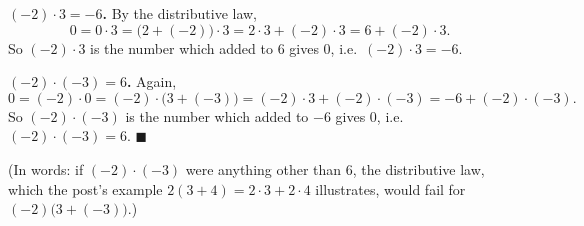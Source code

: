 \textbf{$(-2)\cdot3=-6$.} By the distributive law,
\[
0=0\cdot3=\bigl(2+(-2)\bigr)\cdot3=2\cdot3+(-2)\cdot3=6+(-2)\cdot3 .
\]
So $(-2)\cdot3$ is the number which added to $6$ gives $0$, i.e.\ $(-2)\cdot3=-6$.

\textbf{$(-2)\cdot(-3)=6$.} Again,
\[
0=(-2)\cdot0=(-2)\cdot\bigl(3+(-3)\bigr)=(-2)\cdot3+(-2)\cdot(-3)=-6+(-2)\cdot(-3).
\]
So $(-2)\cdot(-3)$ is the number which added to $-6$ gives $0$, i.e.\ $(-2)\cdot(-3)=6$. $\blacksquare$

(In words: if $(-2)\cdot(-3)$ were anything other than $6$, the distributive law, which the post's example $2(3+4)=2\cdot3+2\cdot4$ illustrates, would fail for $(-2)\bigl(3+(-3)\bigr)$.)
